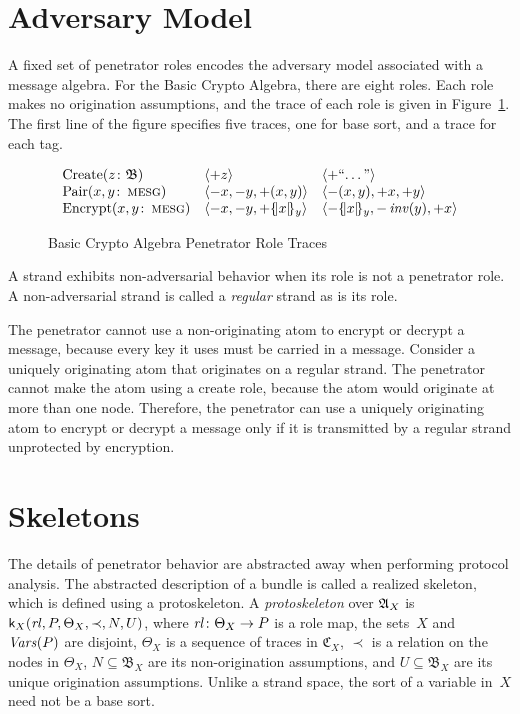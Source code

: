 \documentclass[12pt]{article}
\theoremstyle{definition}
\newcommand{\scap}[1]{\ensuremath{\mathop{\relax
                    \smash{\mbox{\sc#1}}}\!\mathop{\vphantom{#1}}\nolimits}}
\newcommand{\alga}{\alg{A}}
\newcommand{\tr}{\ensuremath{\mathfrak C}}
\newcommand{\base}{\ensuremath{\mathfrak B}}
\newcommand{\svars}{\fn{Vars}}
\newcommand{\skel}{\mathsf{k}}
\newcommand{\rl}{\fn{rl}}
\begin{document}
\section{Adversary Model}\label{sec:adversary model}

A fixed set of penetrator roles encodes the adversary model associated
with a message algebra.  For the Basic Crypto Algebra, there are eight
roles.  Each role makes no origination assumptions, and the trace of
each role is given in Figure~\ref{fig:pen}.  The first line of the
figure specifies five traces, one for base sort, and a trace for each
tag.

\begin{figure}
$$\begin{array}{lll}
\mbox{Create}(z\colon\base)&
\seq{\outbnd z}&\seq{\outbnd\mbox{``\ldots''}}\\
\mbox{Pair}(x,y\colon\scap{mesg})&
\seq{\inbnd x,\inbnd y,\outbnd(x, y)}&
\seq{\inbnd(x, y),\outbnd x,\outbnd y}\\
\mbox{Encrypt}(x,y\colon\scap{mesg})&
\seq{\inbnd x,\inbnd y,\outbnd\enc{x}{y}}&
\seq{\inbnd\enc{x}{y},\inbnd \fn{inv}(y),\outbnd x}
\end{array}$$
\caption{Basic Crypto Algebra Penetrator Role Traces}\label{fig:pen}
\end{figure}

A strand exhibits non-adversarial behavior when its role is not a
penetrator role.  A non-adversarial strand is called a \emph{regular}
strand as is its role.

The penetrator cannot use a non-originating atom to encrypt or decrypt
a message, because every key it uses must be carried in a message.
Consider a uniquely originating atom that originates on a regular
strand.  The penetrator cannot make the atom using a create role,
because the atom would originate at more than one node.  Therefore,
the penetrator can use a uniquely originating atom to encrypt or
decrypt a message only if it is transmitted by a regular strand
unprotected by encryption.

\section{Skeletons}\label{sec:skeletons}

The details of penetrator behavior are abstracted away when performing
protocol analysis.  The abstracted description of a bundle is called a
realized skeleton, which is defined using a protoskeleton.  A
\emph{protoskeleton} over $\alga_X$ is
$\skel_X(\rl,P,\Theta_X,\prec,N,U)$, where $\rl\colon\Theta_X\to P$ is
a role map, the sets~$X$ and~$\svars(P)$ are disjoint,
$\Theta_X$ is a sequence of traces in $\tr_X$, $\prec$ is a relation
on the nodes in $\Theta_X$, $N\subseteq\base_X$ are its
non-origination assumptions, and $U\subseteq\base_X$ are its unique
origination assumptions.  Unlike a strand space, the sort of a
variable in~$X$ need not be a base sort.
\end{document}
